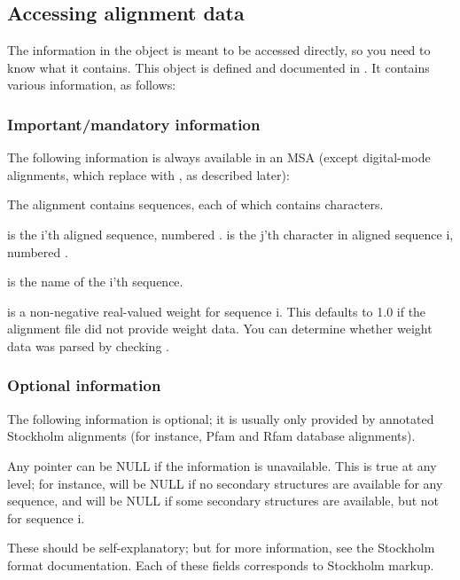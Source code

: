 \subsection{Accessing alignment data}

The information in the  object is meant to be accessed
directly, so you need to know what it contains. This object is defined
and documented in . It contains various information,
as follows:

\subsubsection{Important/mandatory information}

The following information is always available in an MSA (except
digital-mode alignments, which replace  with
, as described later):



The alignment contains  sequences, each of which contains
 characters.

 is the i'th aligned sequence, numbered
.  is the j'th character in aligned
sequence i, numbered .

 is the name of the i'th sequence.

 is a non-negative real-valued weight for sequence
i. This defaults to 1.0 if the alignment file did not provide weight
data. You can determine whether weight data was parsed by checking
.

\subsubsection{Optional information}

The following information is optional; it is usually only provided by
annotated Stockholm alignments (for instance, Pfam and Rfam database
alignments). 

Any pointer can be NULL if the information is unavailable. This is
true at any level; for instance,  will be NULL if no
secondary structures are available for any sequence, and 
will be NULL if some secondary structures are available, but not for
sequence i. 



These should be self-explanatory; but for more information, see the
Stockholm format documentation. Each of these fields corresponds to
Stockholm markup.

